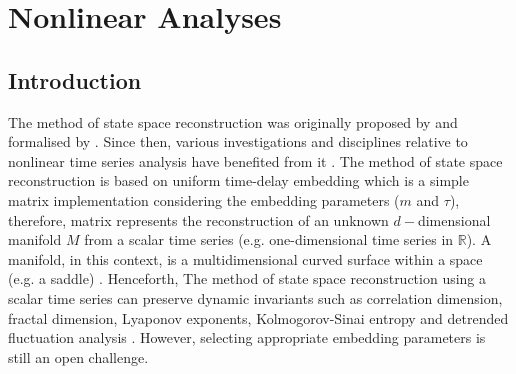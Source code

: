                       \chapter{Nonlinear Analyses}



%
\graphicspath{{figs/chapter3/PDF/}}






\section{Introduction}
The method of state space reconstruction was originally proposed by 
\cite{packard1980} and formalised by \cite{takens1981}. Since then, various 
investigations and disciplines relative to nonlinear time series analysis 
have benefited from it \citep{aguirre2009, stergiou2011, frank2010, sama2013}.
The method of state space reconstruction is based on uniform time-delay 
embedding which is a simple matrix implementation considering the embedding 
parameters ($m$ and $\tau$), therefore, matrix represents the reconstruction
of an unknown $d-$dimensional manifold $M$ from a scalar 
time series (e.g. one-dimensional time series in $\mathbb{R}$).
A manifold, in this context, is a multidimensional curved surface within a 
space (e.g. a saddle) \citep{guastello-gregson2011}.
Henceforth, The method of state space reconstruction using a scalar time series 
can preserve dynamic invariants such as correlation dimension, 
fractal dimension, Lyaponov exponents, Kolmogorov-Sinai entropy and 
detrended fluctuation analysis \citep{bradley2015, Quintana-Duque2012, 
Quintana-Duque2013, Quintana-Duque2016, krakovska2015}.
However, selecting appropriate embedding parameters is still an open 
challenge. 

